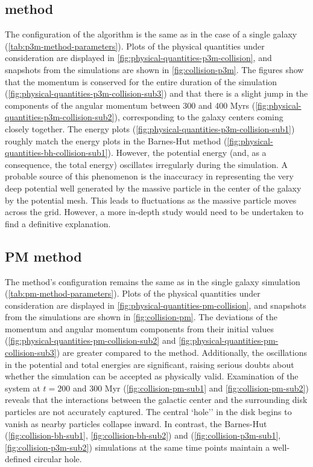 \subsection{\texorpdfstring{\PThreeM{}}{P3M} method}
The configuration of the algorithm is the same as in the case of a single galaxy (\autoref{tab:p3m-method-parameters}).
Plots of the physical quantities under consideration are displayed in \autoref{fig:physical-quantities-p3m-collision}, and snapshots from the simulations are shown in \autoref{fig:collision-p3m}.
The figures show that the momentum is conserved for the entire duration of the simulation (\autoref{fig:physical-quantities-p3m-collision-sub3}) and that there is a slight jump in the components of the angular momentum between 300 and 400 Myrs (\autoref{fig:physical-quantities-p3m-collision-sub2}), corresponding to the galaxy centers coming closely together.
The energy plots (\autoref{fig:physical-quantities-p3m-collision-sub1}) roughly match the energy plots in the Barnes-Hut method (\autoref{fig:physical-quantities-bh-collision-sub1}).
However, the potential energy (and, as a consequence, the total energy) oscillates irregularly during the simulation.
A probable source of this phenomenon is the inaccuracy in representing the very deep potential well generated by the massive particle in the center of the galaxy by the potential mesh.
This leads to fluctuations as the massive particle moves across the grid.
However, a more in-depth study would need to be undertaken to find a definitive explanation.

\subsection{PM method}
The method's configuration remains the same as in the single galaxy simulation (\autoref{tab:pm-method-parameters}).
Plots of the physical quantities under consideration are displayed in \autoref{fig:physical-quantities-pm-collision}, and snapshots from the simulations are shown in \autoref{fig:collision-pm}.
The deviations of the momentum and angular momentum components from their initial values (\autoref{fig:physical-quantities-pm-collision-sub2} and \autoref{fig:physical-quantities-pm-collision-sub3}) are greater compared to the \PThreeM{} method.
Additionally, the oscillations in the potential and total energies are significant, raising serious doubts about whether the simulation can be accepted as physically valid.
Examination of the system at $t = 200$ and $300$ Myr (\autoref{fig:collision-pm-sub1} and \autoref{fig:collision-pm-sub2}) reveals that the interactions between the galactic center and the surrounding disk particles are not accurately captured.
The central `hole'' in the disk begins to vanish as nearby particles collapse inward.
In contrast, the Barnes-Hut (\autoref{fig:collision-bh-sub1}, \autoref{fig:collision-bh-sub2}) and \PThreeM{} (\autoref{fig:collision-p3m-sub1}, \autoref{fig:collision-p3m-sub2}) simulations at the same time points maintain a well-defined circular hole.
